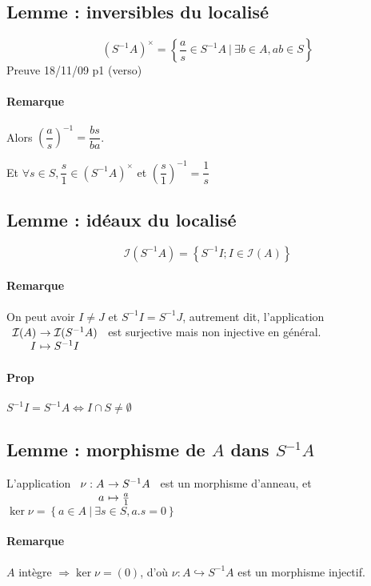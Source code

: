 \documentclass[reqno,a4paper,10pt]{report}
\newcommand{\set}[1]{\left\lbrace #1 \right\rbrace} %
\newcommand{\so}{\Rightarrow}
\newcommand{\inj}{\hookrightarrow}
\newcommand{\Such}{\ \Big| \ }
\newcommand{\such}{\ | \ }
\begin{document}
\subsection{Lemme : inversibles du localisé}
\[\left( S^{-1}A \right)^\times = \set{\frac{a}{s}\in S^{-1}A \Such \exists b
\in A, ab \in S}\]
  Preuve 18/11/09 p1 (verso)

\paragraph{Remarque} Alors $\left( \dfrac{a}{s}
\right)^{-1}=\dfrac{bs}{ba}$.

Et $\forall s \in S, \dfrac{s}{1} \in (S^{-1}A)^\times$ et $\left(
\dfrac{s}{1} \right)^{-1}=\dfrac{1}{s}$

\subsection{Lemme : idéaux du localisé}
\[\mathcal I(S^{-1}A)=\set{S^{-1}I; I \in \mathcal I(A)}\]

\paragraph{Remarque} On peut avoir $I\neq J$ et $S^{-1}I = S^{-1}J$, autrement
dit, l'application $\begin{array}[t]{r@{\ }l}
  \mathcal I(A) &\to \mathcal I(S^{-1}A)\\
  I &\mapsto S^{-1}I
\end{array}$ est surjective mais non injective en général.

\paragraph{Prop} $S^{-1}I = S^{-1}A \iff I\cap S \neq \emptyset$

\subsection{Lemme : morphisme de $A$ dans $S^{-1}A$}
L'application $\begin{array}[t]{r@{\ }l}
  \nu : A  &\to S^{-1}A\\
  a &\mapsto \frac{a}{1}
\end{array}$ est un morphisme d'anneau, et $\ker \nu = \set{a \in A \such
\exists s \in S, a.s=0}$

\paragraph{Remarque} $A$ intègre $\so \ker \nu = (0)$, d'où $\nu:A \inj
S^{-1}A$ est un morphisme injectif.
\end{document}
